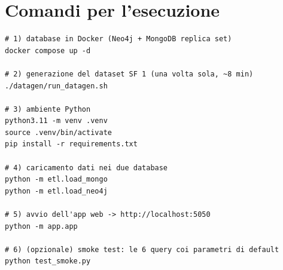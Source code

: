 \documentclass[11pt,a4paper]{article}
\begin{document}
\section{Comandi per l'esecuzione}

\begin{lstlisting}[style=plain,caption={Avvio completo del prototipo.},captionpos=b]
# 1) database in Docker (Neo4j + MongoDB replica set)
docker compose up -d

# 2) generazione del dataset SF 1 (una volta sola, ~8 min)
./datagen/run_datagen.sh

# 3) ambiente Python
python3.11 -m venv .venv
source .venv/bin/activate
pip install -r requirements.txt

# 4) caricamento dati nei due database
python -m etl.load_mongo
python -m etl.load_neo4j

# 5) avvio dell'app web -> http://localhost:5050
python -m app.app

# 6) (opzionale) smoke test: le 6 query coi parametri di default
python test_smoke.py
\end{lstlisting}
\end{document}
